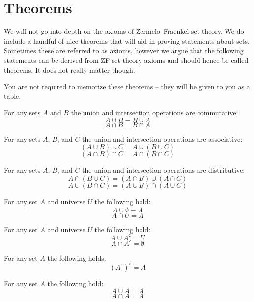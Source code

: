 \documentclass[main.tex]{subfiles}
\begin{document}
\section{Theorems}

We will not go into depth on the axioms of Zermelo–Fraenkel set theory. We do include a handful of nice theorems that will aid in proving statements about sets. Sometimes these are referred to as axioms, however we argue that the following statements can be derived from ZF set theory axioms and should hence be called theorems. It does not really matter though.

You are not required to memorize these theorems -- they will be given to you as a table.

\begin{thm}[Commutativity]
	For any sets \(A\) and \(B\) the union and intersection operations are commutative: \[A \cup B = B \cup A\] \[A \cap B = B \cap A\]
\end{thm}

\begin{thm}[Associativity]
	For any sets \(A\), \(B\), and \(C\) the union and intersection operations are associative: \[(A \cup B) \cup C = A \cup (B \cup C)\] \[(A \cap B) \cap C = A \cap (B \cap C)\]
\end{thm}

\begin{thm}[Distributivity]
	For any sets \(A\), \(B\), and \(C\) the union and intersection operations are distributive: \[A \cap (B \cup C) = (A \cap B) \cup (A \cap C)\] \[A \cup (B \cap C) = (A \cup B) \cap (A \cup C)\]
\end{thm}

\begin{thm}[Identity]
	For any set \(A\) and universe \(U\) the following hold: \[A \cup \emptyset = A\] \[A \cap U = A\]
\end{thm}

\begin{thm}[Inverse]
	For any set \(A\) and universe \(U\) the following hold: \[A \cup A^{\mathsf{c}} = U\] \[A \cap A^{\mathsf{c}} = \emptyset\]
\end{thm}

\begin{thm}
	For any set \(A\) the following holds: \[(A^{\mathsf{c}})^{\mathsf{c}} = A\]
\end{thm}

\begin{thm}[Idempotence]
	For any set \(A\) the following hold: \[A \cup A = A\] \[A \cap A = A\]
\end{thm}
\end{document}
